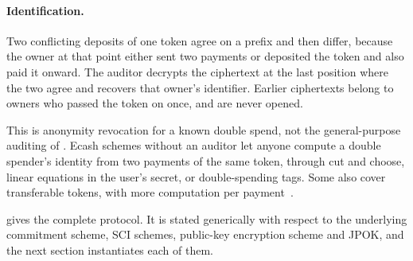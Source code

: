 \paragraph{Identification.} Two conflicting deposits of one token agree on a
prefix and then differ, because the owner at that point either sent two
payments or deposited the token and also paid it onward. The auditor decrypts
the ciphertext at the last position where the two agree and recovers that
owner's identifier. Earlier ciphertexts belong to owners who passed the token
on once, and are never opened.

This is anonymity revocation for a known double spend, not the general-purpose
auditing of . Ecash schemes without an auditor let anyone
compute a double spender's identity from two payments of the same token,
through cut and choose, linear equations in the user's secret, or
double-spending tags. Some also cover transferable tokens, with more computation per
payment~\cite{C:ChaFiaNao88,C:Brands93,EC:CamHohLys05,PKC:BCFK15}.

 gives the complete protocol. It is stated generically with
respect to the underlying commitment scheme, SCI schemes, public-key encryption
scheme and JPOK, and the next section
instantiates each of them.


